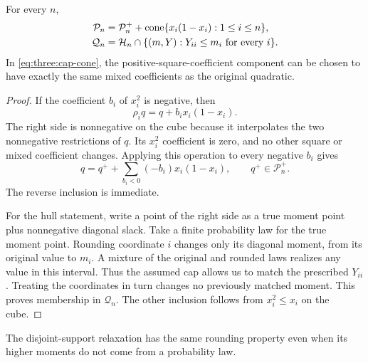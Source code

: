 \begin{proposition}\label{three:caps}
For every $n$,
\begin{align}
 \mathcal P_n&=\mathcal P_n^+
       +\operatorname{cone}\{x_i(1-x_i):1\le i\le n\},\label{eq:three:cap-cone}\\
 \mathcal Q_n&=\mathcal H_n\cap
       \{(m,Y):Y_{ii}\le m_i\text{ for every }i\}.
       \label{eq:three:cap-hull}
\end{align}
In \eqref{eq:three:cap-cone}, the positive-square-coefficient component can
be chosen to have exactly the same mixed coefficients as the original
quadratic.
\end{proposition}
\begin{proof}
If the coefficient $b_i$ of $x_i^2$ is negative, then
\[
 \rho_iq=q+b_ix_i(1-x_i).
\]
The right side is nonnegative on the cube because it interpolates the
two nonnegative restrictions of $q$. Its $x_i^2$ coefficient is zero,
and no other square or mixed coefficient changes. Applying this operation
to every negative $b_i$ gives
\[
 q=q^++\sum_{b_i<0}(-b_i)x_i(1-x_i),\qquad q^+\in\mathcal P_n^+.
\]
The reverse inclusion is immediate.

For the hull statement, write a point of the right side as a true moment
point plus nonnegative diagonal slack. Take a finite probability law for
the true moment point. Rounding coordinate $i$ changes only its diagonal
moment, from its original value to $m_i$. A mixture of the original and
rounded laws realizes any value in this interval. Thus the assumed cap
allows us to match the prescribed $Y_{ii}$. Treating the coordinates in
turn changes no previously matched moment. This proves membership in
$\mathcal Q_n$. The other inclusion follows from $x_i^2\le x_i$ on the
cube.
\end{proof}

The disjoint-support relaxation has the same rounding property even when
its higher moments do not come from a probability law.

